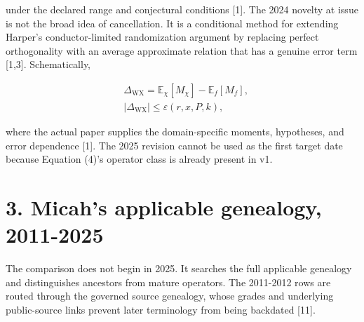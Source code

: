 \documentclass[
  american,
  11pt,
  letterpaper,
]{article}
\begin{document}
under the declared range and conjectural conditions {[}1{]}. The 2024 novelty at issue is not the broad idea of cancellation. It is a conditional method for extending Harper's conductor-limited randomization argument by replacing perfect orthogonality with an average approximate relation that has a genuine error term {[}1,3{]}. Schematically,

\begin{equation}
\begin{aligned}
& \Delta_{\mathrm{WX}}
=
\mathbb{E}_{\chi}[M_{\chi}]
-
\mathbb{E}_{f}[M_f], \\
& |\Delta_{\mathrm{WX}}|\le \varepsilon(r,x,P,k),
\end{aligned}
\tag{4}
\end{equation}

where the actual paper supplies the domain-specific moments, hypotheses, and error dependence {[}1{]}. The 2025 revision cannot be used as the first target date because Equation (4)'s operator class is already present in v1.

\section{3. Micah's applicable genealogy, 2011-2025}\label{micahs-applicable-genealogy-2011-2025}

The comparison does not begin in 2025. It searches the full applicable genealogy and distinguishes ancestors from mature operators. The 2011-2012 rows are routed through the governed source genealogy, whose grades and underlying public-source links prevent later terminology from being backdated {[}11{]}.
\end{document}
